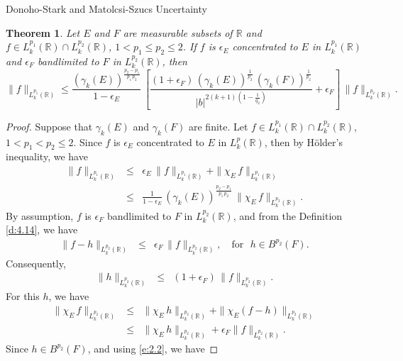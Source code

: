 \documentclass[12pt,a4paper,reqno]{amsproc}
\newtheorem{theorem}{Theorem}[section]
\theoremstyle{definition}
\theoremstyle{remark}
\numberwithin{equation}{section}
\begin{document}
\begin{subsection}{Donoho-Stark and Matolcsi-Szucs Uncertainty}
\begin{theorem}
    Let $E$ and $F$ are measurable subsets of $\mathbb{R}$ and  $f \in L_k^{p_1}(\mathbb{R}) \cap L_k^{p_2}(\mathbb{R})$, $1< p_1 \le p_2 \le 2$. If $f$ is $\epsilon_{E}$ concentrated to $E$ in $L_k^{p_1}(\mathbb{R})$ and $\epsilon_{F}$ bandlimited to $F$ in $L_k^{p_2}(\mathbb{R})$, then
    \begin{equation*}
\|f\|_{L_k^{p_1}(\mathbb{R})} \le \frac{(\gamma_k(E))^{\frac{p_2-p_1}{p_1\,p_2}}}{1-\epsilon_E}  \,  \left[\frac{(1+\epsilon_{F})\,(\gamma_k(E))^{\frac{1}{p_2}}\, (\gamma_k(F))^{\frac{1}{p_2}}}{|b|^{2(k+1)\left(1-\frac{1}{q_2}\right)}}+\epsilon_{F}\right] \, \|f\|_{L_k^{p_2}(\mathbb{R})} .
    \end{equation*}
\end{theorem}
\begin{proof}
    Suppose that $\gamma_k(E)$ and $\gamma_k(F)$ are finite. Let $f\in L_k^{p_1}(\mathbb{R}) \cap L_k^{p_2}(\mathbb{R})$, $1<p_1<p_2\le 2.$ Since $f$ is $\epsilon_E$ concentrated to $E$ in $L_k^p(\mathbb{R})$, then by H{\"o}lder's inequality, we have
\begin{eqnarray}
\nonumber\|f\|_{L_k^{p_1}(\mathbb{R})} &\le& \epsilon_E\,\|f\|_{L_k^{p_1}(\mathbb{R})}+\|\chi_E\,f\|_{L_k^{p_1}(\mathbb{R})}\\
 \label{e:7.3}
  &\le&  \frac{1}{1-\epsilon_E} \,(\gamma_k(E))^{\frac{p_2-p_1}{p_1\,p_2}}  \, \|\chi_E\,f\|_{L_k^{p_2}(\mathbb{R})}.
\end{eqnarray}
    By assumption, $f$ is $\epsilon_{F}$ bandlimited to $F$ in $L_k^{p_2}(\mathbb{R})$, and from  the Definition \ref{d:4.14}, we have
 \begin{eqnarray}
\nonumber \|f-h\|_{L_k^{p_2}(\mathbb{R})}  &\le &\epsilon_{F} \, \|f\|_{L_k^{p_2}(\mathbb{R})}, \quad \text{for}\,\,\,\, h\in B^{p_2}(F).  
 \end{eqnarray}
Consequently,
 \begin{eqnarray*}
\|h\|_{L_k^{p_2}(\mathbb{R})}  &\le &(1+\epsilon_{F})\, \|f\|_{L_k^{p_2}(\mathbb{R})}.
 \end{eqnarray*}
For this $h$, we have
\begin{eqnarray}
\nonumber    \|\chi_E\,f\|_{L_k^{p_2}(\mathbb{R})}&\le& \|\chi_E\,h\|_{L_k^{p_2}(\mathbb{R})}+\|\chi_E(f-h)\|_{L_k^{p_2}(\mathbb{R})}\\
    &\le& \|\chi_E\,h\|_{L_k^{p_2}(\mathbb{R})}+\epsilon_F\|f\|_{L_k^{p_2}(\mathbb{R})}.\label{e:7.4}
\end{eqnarray}
Since $h\in B^{p_2}(F)$, and using 
 \eqref{e:2.2}, we have

\end{proof}
\end{subsection}
\end{document}
